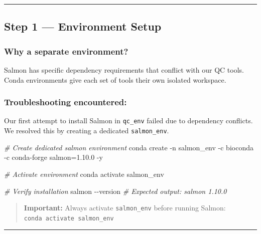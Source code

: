 \documentclass[
]{article}
\newenvironment{Shaded}{\begin{snugshade}}{\end{snugshade}}
\newcommand{\AttributeTok}[1]{\textcolor[rgb]{0.13,0.29,0.53}{#1}}
\newcommand{\CommentTok}[1]{\textcolor[rgb]{0.56,0.35,0.01}{\textit{#1}}}
\newcommand{\ExtensionTok}[1]{#1}
\newcommand{\NormalTok}[1]{#1}
\begin{document}
\begin{center}\rule{0.5\linewidth}{0.5pt}\end{center}

\subsection{Step 1 --- Environment
Setup}\label{step-1-environment-setup}

\subsubsection{Why a separate
environment?}\label{why-a-separate-environment}

Salmon has specific dependency requirements that conflict with our QC
tools. Conda environments give each set of tools their own isolated
workspace.

\subsubsection{Troubleshooting
encountered:}\label{troubleshooting-encountered}

Our first attempt to install Salmon in \texttt{qc\_env} failed due to
dependency conflicts. We resolved this by creating a dedicated
\texttt{salmon\_env}.

\begin{Shaded}
\begin{Highlighting}[]
\CommentTok{\# Create dedicated salmon environment}
\ExtensionTok{conda}\NormalTok{ create }\AttributeTok{{-}n}\NormalTok{ salmon\_env }\AttributeTok{{-}c}\NormalTok{ bioconda }\AttributeTok{{-}c}\NormalTok{ conda{-}forge salmon=1.10.0 }\AttributeTok{{-}y}

\CommentTok{\# Activate environment}
\ExtensionTok{conda}\NormalTok{ activate salmon\_env}

\CommentTok{\# Verify installation}
\ExtensionTok{salmon} \AttributeTok{{-}{-}version}
\CommentTok{\# Expected output: salmon 1.10.0}
\end{Highlighting}
\end{Shaded}

\begin{quote}
\textbf{Important:} Always activate \texttt{salmon\_env} before running
Salmon: \texttt{conda\ activate\ salmon\_env}
\end{quote}

\begin{center}\rule{0.5\linewidth}{0.5pt}\end{center}
\end{document}
